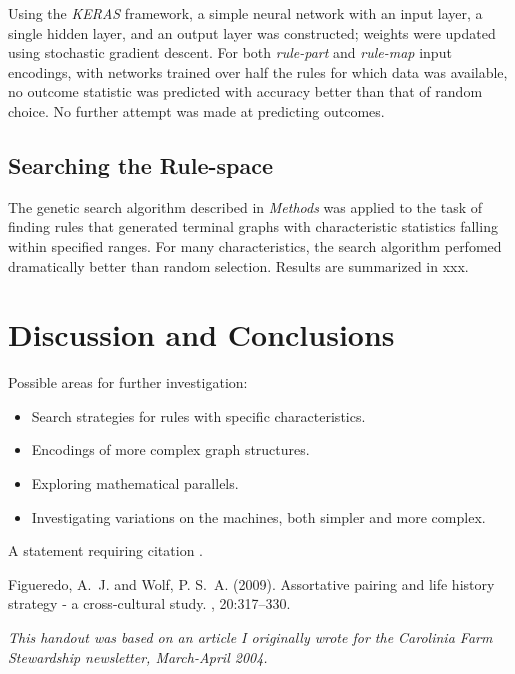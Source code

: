 \documentclass{tufte-handout}
\begin{document}
Using the \textit{KERAS} framework, a simple neural network with an input
layer, a single hidden layer, and an output layer was constructed; weights
were updated using stochastic gradient descent. For both \textit{rule-part} and
\textit{rule-map} input encodings, with networks trained over half the rules for
which data was available, no outcome statistic was predicted with accuracy
better than that of random choice. No further attempt was made at predicting
outcomes.

\subsection{Searching the Rule-space}

The genetic search algorithm described in \textit{Methods} was applied to
the task of finding rules that generated terminal graphs with characteristic
statistics falling within specified ranges. For many characteristics, the
search algorithm perfomed dramatically better than random selection. Results
are summarized in xxx.


\section{Discussion and Conclusions}

Possible areas for further investigation:

\begin{itemize}
    \item Search strategies for rules with specific characteristics.
    \item Encodings of more complex graph structures.
    \item Exploring mathematical parallels.
    \item Investigating variations on the machines, both simpler and more complex.
\end{itemize}

A statement requiring citation \cite{Figueredo:2009dg}.


\begin{thebibliography}{99} %

Figueredo, A.~J. and Wolf, P. S.~A. (2009).
\newblock Assortative pairing and life history strategy - a cross-cultural
  study.
, 20:317--330.
 
\end{thebibliography}

\vspace{1cm}

\emph{This handout was based on an article I originally wrote for the Carolinia Farm Stewardship newsletter, March-April 2004.}
\end{document}

